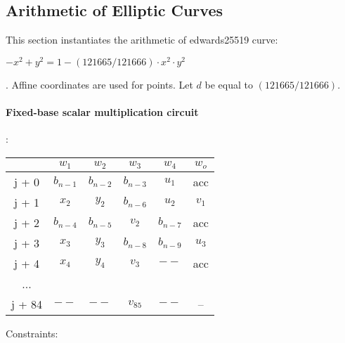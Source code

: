 \subsection{Arithmetic of Elliptic Curves} \label{ellcurve}
This section instantiates the arithmetic of edwards25519 curve:
\begin{center}
$- x^2 + y^2 = 1 - (121665/121666) \cdot x^2 \cdot y^2$
\end{center}.
Affine coordinates are used for points. 
Let $d$ be equal to $(121665/121666)$.

\paragraph{Fixed-base scalar multiplication circuit}:
\begin{center}
\begin{tabular}{ |c|c|c|c|c|c } 
  & $w_1$ & $w_2$ & $w_3$ & $w_4$ & $w_o$\\ 
 \hline
j + 0 & $b_{n - 1}$ & $b_{n - 2}$ & $b_{n - 3}$ & $u_1$ & acc\\ 
j + 1 & $x_2$ & $y_2$ & $b_{n - 6}$ & $u_2$ & $v_1$\\ 
j + 2 & $b_{n - 4}$ & $b_{n - 5}$ & $v_2$ & $b_{n - 7}$ & acc\\ 
j + 3 & $x_3$ & $ y_3$ & $b_{n - 8}$ & $b_{n - 9}$ & $u_3$\\ 
j + 4 & $x_4$ & $y_4$ & $v_3$ & $--$ & acc\\ 
... & & & & &\\ 
j + 84 & $--$ & $--$ & $v_85$ & $--$ & --\\ 

 \hline
\end{tabular}
\end{center}
 Constraints:
